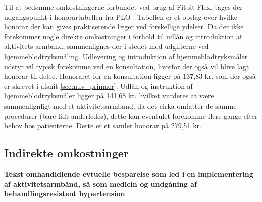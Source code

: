 Til at bedømme omkostningerne forbundet ved brug af Fitbit Flex, tages der udgangspunkt i honorartabellen fra PLO \citep{honorartabel2016}. Tabellen er et opslag over hvilke honorar der kan gives praktiserende læger ved forskellige ydelser.
Da der ikke forekommer nogle direkte omkostninger i forhold til udlån og introduktion af aktivitets armbånd, sammenlignes der i stedet med udgifterne ved hjemmeblodtryksmåling. Udlevering og introduktion af hjemmeblodtryksmåler udstyr vil typisk forekomme ved en konsultation, hvorfor der også vil blive lagt honorar til dette. Honoraret for en konsultation ligger på 137,83 kr. som der også er skrevet i afsnit \autoref{sec:nuv_primaer}. Udlån og instruktion af hjemmeblodtryksmåler ligger på 141,68 kr. hvilket vurderes at være sammenlignligt med et aktivitetsarmbånd, da det cirka omfatter de samme procedurer (bare lidt anderledes), dette kan eventulet forekomme flere gange efter behov hos patienterne. Dette er et samlet honorar på 279,51 kr.

\subsection{Indirekte omkostninger}

\textbf{Tekst omhandldlende evtuelle besparelse som led i en implementering af aktivitetsarmbånd, så som medicin og undgåning af behandlingsresistent hypertension}













\begin{comment}
Hvad koster et Fitbit Flex? 
Hvilke besparelser tilbydes der så sundhedsektoren? 

Hvad koster det så at introducere patienterne til teknologien? 
	Hvad dækker den her introduktion minimum over, for at kunne anvende armbåndet? (Anvendelse af app og hvordan den skal oplades.)
	
Hvad koster det hvis de har spørgsmål vedr. teknologien? 


Langsigtet omkostninger - hvis behandlingen hjælper/ikke hjælper
- Besparelser vedr. medicinering 
- Besparelser vedr. ambulant forløb 
- Forebyggelse af behandlingsresistent hypertension = $$$$



EVT: Dags-takster i sekundær sektor (Ambulant).



En model i almen praktsis for implementeringen af aktivitetsarmbånd?

Honorartabel = \citep{honorartabel2016}
\end{comment}